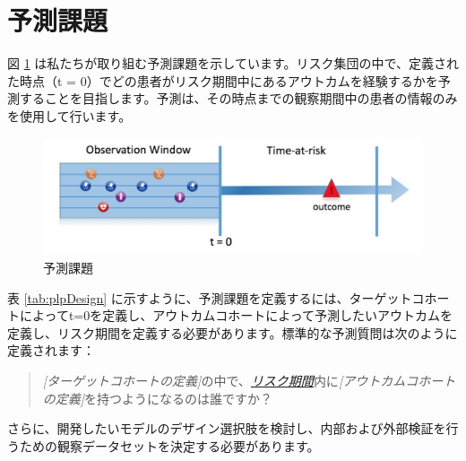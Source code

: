\documentclass[
  11pt]{book}
\theoremstyle{definition}
\theoremstyle{definition}
\theoremstyle{definition}
\theoremstyle{definition}
\theoremstyle{remark}
\begin{document}
\section{予測課題}\label{ux4e88ux6e2cux8ab2ux984c}

図 \ref{fig:figure1} は私たちが取り組む予測課題を示しています。リスク集団の中で、定義された時点（t = 0）でどの患者がリスク期間中にあるアウトカムを経験するかを予測することを目指します。予測は、その時点までの観察期間中の患者の情報のみを使用して行います。

\begin{figure}
\includegraphics[width=1\linewidth]{images/PatientLevelPrediction/Figure1} \caption{予測課題}\label{fig:figure1}
\end{figure}

表 \ref{tab:plpDesign} に示すように、予測課題を定義するには、ターゲットコホートによってt=0を定義し、アウトカムコホートによって予測したいアウトカムを定義し、リスク期間を定義する必要があります。標準的な予測質問は次のように定義されます：   

\begin{quote}
\emph{{[}ターゲットコホートの定義{]}}の中で、\emph{\hyperref[ux30eaux30b9ux30afux671fux9593]{リスク期間}}内に\emph{{[}アウトカムコホートの定義{]}}を持つようになるのは誰ですか？
\end{quote}

さらに、開発したいモデルのデザイン選択肢を検討し、内部および外部検証を行うための観察データセットを決定する必要があります。
\end{document}
